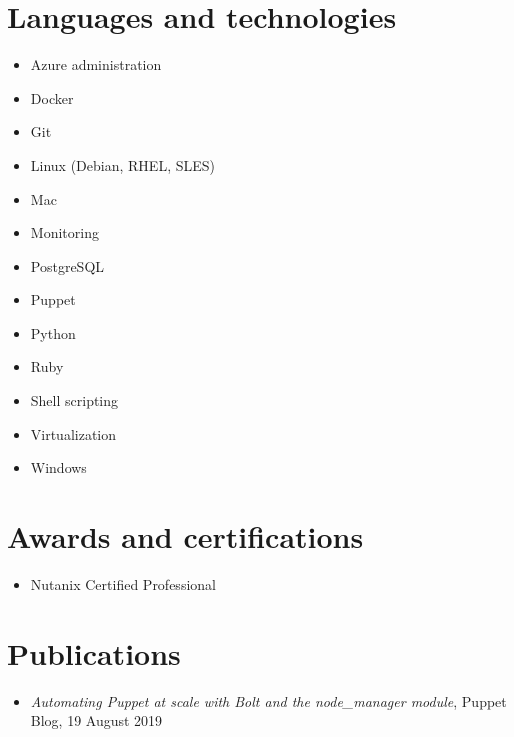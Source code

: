 \documentclass[10pt]{article}
\begin{document}
\section*{Languages and technologies}
\vspace{-0.75em}
\begin{multicols}{3}
    \begin{itemize}
        \item Azure administration
        \item Docker
        \item Git
        \item Linux (Debian, RHEL, SLES)
        \item Mac
        \item Monitoring
        \item PostgreSQL
        \item Puppet
        \item Python
        \item Ruby
        \item Shell scripting
        \item Virtualization
        \item Windows
    \end{itemize}
\end{multicols}

\section*{Awards and certifications}
\begin{itemize}
    \item Nutanix Certified Professional
\end{itemize}

\section*{Publications}
\begin{itemize}
    \item \textit{Automating Puppet at scale with Bolt and the node\_manager module}, Puppet Blog, 19 August 2019
\end{itemize}
\end{document}
